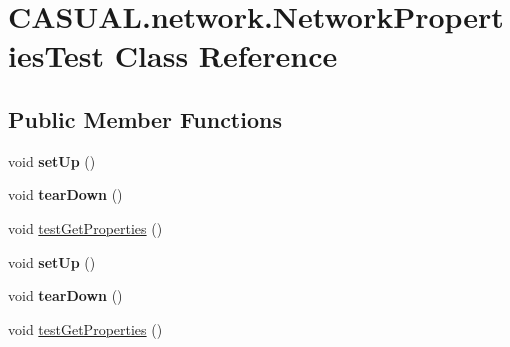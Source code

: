 \hypertarget{class_c_a_s_u_a_l_1_1network_1_1_network_properties_test}{\section{C\-A\-S\-U\-A\-L.\-network.\-Network\-Properties\-Test Class Reference}
\label{class_c_a_s_u_a_l_1_1network_1_1_network_properties_test}
}
\subsection*{Public Member Functions}
\begin{DoxyCompactItemize}
\item 
\hypertarget{class_c_a_s_u_a_l_1_1network_1_1_network_properties_test_a89dada6e619eb2ba2041a1fadb047529}{void {\bfseries set\-Up} ()}\label{class_c_a_s_u_a_l_1_1network_1_1_network_properties_test_a89dada6e619eb2ba2041a1fadb047529}

\item 
\hypertarget{class_c_a_s_u_a_l_1_1network_1_1_network_properties_test_a90835f479ce30682b93ff3a6d815701a}{void {\bfseries tear\-Down} ()}\label{class_c_a_s_u_a_l_1_1network_1_1_network_properties_test_a90835f479ce30682b93ff3a6d815701a}

\item 
void \hyperlink{class_c_a_s_u_a_l_1_1network_1_1_network_properties_test_a9c6a7641cbdada43053ee2970dcdfaa5}{test\-Get\-Properties} ()
\item 
\hypertarget{class_c_a_s_u_a_l_1_1network_1_1_network_properties_test_a89dada6e619eb2ba2041a1fadb047529}{void {\bfseries set\-Up} ()}\label{class_c_a_s_u_a_l_1_1network_1_1_network_properties_test_a89dada6e619eb2ba2041a1fadb047529}

\item 
\hypertarget{class_c_a_s_u_a_l_1_1network_1_1_network_properties_test_a90835f479ce30682b93ff3a6d815701a}{void {\bfseries tear\-Down} ()}\label{class_c_a_s_u_a_l_1_1network_1_1_network_properties_test_a90835f479ce30682b93ff3a6d815701a}

\item 
void \hyperlink{class_c_a_s_u_a_l_1_1network_1_1_network_properties_test_a9c6a7641cbdada43053ee2970dcdfaa5}{test\-Get\-Properties} ()
\end{DoxyCompactItemize}
